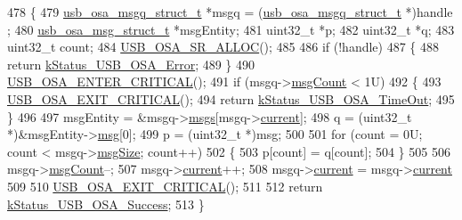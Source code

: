 \begin{DoxyCode}
478 \{
479     \hyperlink{struct__usb__osa__msgq__struct}{usb\_osa\_msgq\_struct\_t} *msgq = (\hyperlink{struct__usb__osa__msgq__struct}{usb\_osa\_msgq\_struct\_t} *)handle
      ;
480     \hyperlink{struct__usb__osa__msg__struct}{usb\_osa\_msg\_struct\_t} *msgEntity;
481     uint32\_t *p;
482     uint32\_t *q;
483     uint32\_t count;
484     \hyperlink{usb__osa__bm_8h_a8dbccf46cc2f8e3b5cece6a4a84f7ae8}{USB\_OSA\_SR\_ALLOC}();
485 
486     \textcolor{keywordflow}{if} (!handle)
487     \{
488         \textcolor{keywordflow}{return} \hyperlink{group__usb__os__abstraction_gga453ebd2f93aafb8c938c3a23c815f9bda40b794ea06e27b8ec1d67538f12eb350}{kStatus\_USB\_OSA\_Error};
489     \}
490     \hyperlink{usb__osa__bm_8h_a0485f70bf9c9a22f0340f014bc567362}{USB\_OSA\_ENTER\_CRITICAL}();
491     \textcolor{keywordflow}{if} (msgq->\hyperlink{struct__usb__osa__msgq__struct_ad3256f6cde77697e233c64bff47ada29}{msgCount} < 1U)
492     \{
493         \hyperlink{usb__osa__bm_8h_a5b8053eca19b6df666a26fad3b07f953}{USB\_OSA\_EXIT\_CRITICAL}();
494         \textcolor{keywordflow}{return} \hyperlink{group__usb__os__abstraction_gga453ebd2f93aafb8c938c3a23c815f9bda9ff36cb34c565283214974d1097d08df}{kStatus\_USB\_OSA\_TimeOut};
495     \}
496 
497     msgEntity = &msgq->\hyperlink{struct__usb__osa__msgq__struct_abca5922025c046e9604252a2e5ff3bd7}{msgs}[msgq->\hyperlink{struct__usb__osa__msgq__struct_ac7756db309b7ab61b6eea39bc496945e}{current}];
498     q = (uint32\_t *)&msgEntity->\hyperlink{struct__usb__osa__msg__struct_a91880d9450b8871ab19a065407e0b52e}{msg}[0];
499     p = (uint32\_t *)msg;
500 
501     \textcolor{keywordflow}{for} (count = 0U; count < msgq->\hyperlink{struct__usb__osa__msgq__struct_a9ca60eac37ed126c806f087e198eee44}{msgSize}; count++)
502     \{
503         p[count] = q[count];
504     \}
505 
506     msgq->\hyperlink{struct__usb__osa__msgq__struct_ad3256f6cde77697e233c64bff47ada29}{msgCount}--;
507     msgq->\hyperlink{struct__usb__osa__msgq__struct_ac7756db309b7ab61b6eea39bc496945e}{current}++;
508     msgq->\hyperlink{struct__usb__osa__msgq__struct_ac7756db309b7ab61b6eea39bc496945e}{current} = msgq->\hyperlink{struct__usb__osa__msgq__struct_ac7756db309b7ab61b6eea39bc496945e}{current} %
509 
510     \hyperlink{usb__osa__bm_8h_a5b8053eca19b6df666a26fad3b07f953}{USB\_OSA\_EXIT\_CRITICAL}();
511 
512     \textcolor{keywordflow}{return} \hyperlink{group__usb__os__abstraction_gga453ebd2f93aafb8c938c3a23c815f9bdab90805fb75297fda1ca60dbb2283f933}{kStatus\_USB\_OSA\_Success};
513 \}
\end{DoxyCode}


